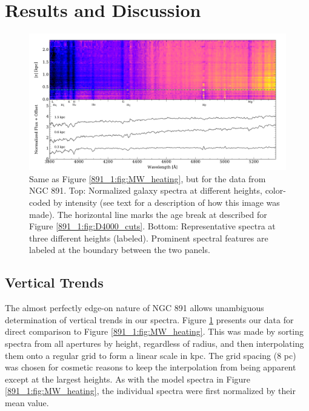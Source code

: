 \section{Results and Discussion}
\label{891_1:sec:results}

\begin{figure}[t]
  \centering
  \includegraphics[width=\textwidth]{891_1/figs/mab_data_stack.pdf}
  \caption[Heating signature in NGC 891 \GP
  data]{\label{891_1:fig:mab_data}\fixspacing Same as Figure
    \ref{891_1:fig:MW_heating}, but for the \GP data from NGC 891. Top:
    Normalized galaxy spectra at different heights, color-coded by
    intensity (see text for a description of how this image was
    made). The horizontal line marks the age break at 
    described for Figure \ref{891_1:fig:D4000_cuts}. Bottom: Representative
    spectra at three different heights (labeled). Prominent spectral
    features are labeled at the boundary between the two panels.}
\end{figure}

\subsection{Vertical Trends}

The almost perfectly edge-on nature of NGC 891 allows unambiguous
determination of vertical trends in our spectra. Figure
\ref{891_1:fig:mab_data} presents our data for direct comparison to Figure
\ref{891_1:fig:MW_heating}. This was made by sorting spectra from all
apertures by height, regardless of radius, and then interpolating them
onto a regular grid to form a linear scale in kpc. The grid spacing (8
pc) was chosen for cosmetic reasons to keep the interpolation from
being apparent except at the largest heights. As with the model
spectra in Figure \ref{891_1:fig:MW_heating}, the individual spectra were
first normalized by their mean value.

